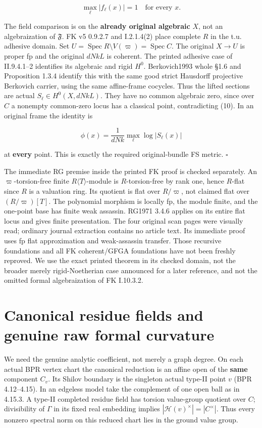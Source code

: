 \documentclass[
  11pt,
]{article}
\begin{document}
\[
                 \max_\ell|f_\ell(x)|=1\quad\text{for every }x.    \tag{10}
\]

The field comparison is on the \textbf{already original algebraic}
\(X\), not an algebraization of \(\mathfrak F\). FK v5 0.9.2.7 and
I.2.1.4(2) place complete \(R\) in the t.u. adhesive domain. Set
\(U=\operatorname{Spec}R\setminus V(\varpi)=\operatorname{Spec}C\). The
original \(X\to U\) is proper fp and the original \(dNkL\) is coherent.
The printed adhesive case of II.9.4.1--2 identifies its algebraic and
rigid \(H^0\). Berkovich1993 whole §1.6 and Proposition 1.3.4 identify
this with the same good strict Hausdorff projective Berkovich carrier,
using the same affine-frame cocycles. Thus the lifted sections are
actual \(S_\ell\in H^0(X,dNkL)\). They have no common algebraic zero,
since over \(C\) a nonempty common-zero locus has a classical point,
contradicting (10). In an original frame the identity is

\[
          \phi(x)=\frac1{dNk}\max_\ell\log|S_\ell(x)|             \tag{11}
\]

at \textbf{every} point. This is exactly the required original-bundle FS
metric. \(\square\)

The immediate RG premise inside the printed FK proof is checked
separately. An \(\varpi\)-torsion-free finite
\(R\langle T\rangle\)-module is \(R\)-torsion-free by rank one, hence
\(R\)-flat since \(R\) is a valuation ring. Its quotient is flat over
\textbf{\(R/\varpi\)}, not claimed flat over \((R/\varpi)[T]\). The
polynomial morphism is locally fp, the module finite, and the one-point
base has finite weak assassin. RG1971 3.4.6 applies on its entire flat
locus and gives finite presentation. The four original scan pages were
visually read; ordinary journal extraction contains no article text. Its
immediate proof uses fp flat approximation and weak-assassin transfer.
Those recursive foundations and all FK coherent/GFGA foundations have
not been freshly reproved. We use the exact printed theorem in its
checked domain, not the broader merely rigid-Noetherian case announced
for a later reference, and not the omitted formal algebraization of FK
I.10.3.2.

\section{Canonical residue fields and genuine raw formal
curvature}\label{canonical-residue-fields-and-genuine-raw-formal-curvature}

We need the genuine analytic coefficient, not merely a graph degree. On
each actual BPR vertex chart the canonical reduction is an affine open
of the \textbf{same} component \(C_v\). Its Shilov boundary is the
singleton actual type-II point \(v\) (BPR 4.12--4.15). In an edgeless
model take the complement of one open ball as in 4.15.3. A type-II
completed residue field has torsion value-group quotient over \(C\);
divisibility of \(\Gamma\) in its fixed real embedding implies
\(|\mathcal H(v)^\times|=|C^\times|\). Thus every nonzero spectral norm
on this reduced chart lies in the ground value group.
\end{document}
